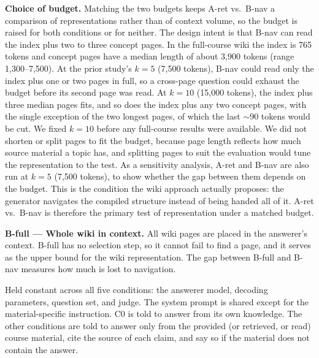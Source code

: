 \documentclass[letterpaper]{article} %
\begin{document}
\textbf{Choice of budget.} Matching the two budgets keeps A-ret vs.\ B-nav a comparison of representations rather than of context volume, so the budget is raised for both conditions or for neither. The design intent is that B-nav can read the index plus two to three concept pages. In the full-course wiki the index is 765 tokens and concept pages have a median length of about 3{,}900 tokens (range 1{,}300--7{,}500). At the prior study's $k{=}5$ (7{,}500 tokens), B-nav could read only the index plus one or two pages in full, so a cross-page question could exhaust the budget before its second page was read. At $k{=}10$ (15{,}000 tokens), the index plus three median pages fits, and so does the index plus any two concept pages, with the single exception of the two longest pages, of which the last ${\sim}$90 tokens would be cut. We fixed $k{=}10$ before any full-course results were available. We did not shorten or split pages to fit the budget, because page length reflects how much source material a topic has, and splitting pages to suit the evaluation would tune the representation to the test. As a sensitivity analysis, A-ret and B-nav are also run at $k{=}5$ (7{,}500 tokens), to show whether the gap between them depends on the budget. This is the condition the wiki approach actually proposes: the generator navigates the compiled structure instead of being handed all of it. A-ret vs.\ B-nav is therefore the primary test of representation under a matched budget.

\textbf{B-full --- Whole wiki in context.} All wiki pages are placed in the answerer's context. B-full has no selection step, so it cannot fail to find a page, and it serves as the upper bound for the wiki representation. The gap between B-full and B-nav measures how much is lost to navigation.

Held constant across all five conditions: the answerer model, decoding parameters, question set, and judge. The system prompt is shared except for the material-specific instruction. C0 is told to answer from its own knowledge. The other conditions are told to answer only from the provided (or retrieved, or read) course material, cite the source of each claim, and say so if the material does not contain the answer.
\end{document}
